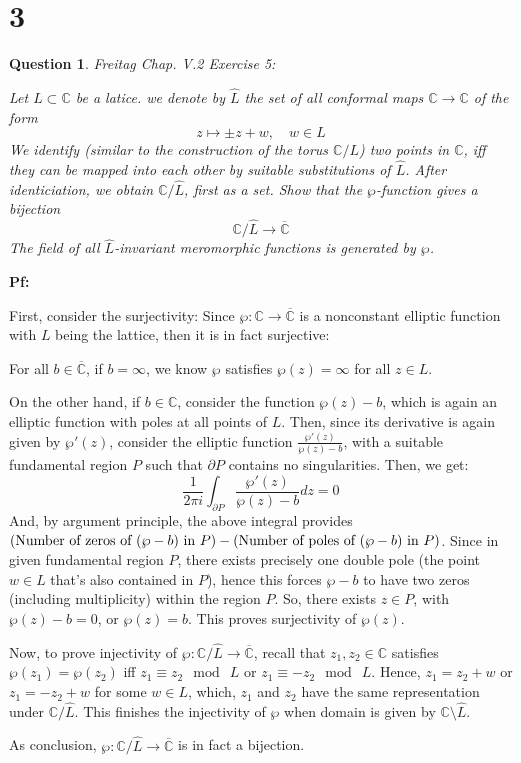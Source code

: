 \documentclass{article}
\newtheorem{question}{Question}
\begin{document}
\section*{3}
\begin{myBox}[]{}
    \begin{question}
        Freitag Chap. V.2 Exercise 5:

        Let $L\subset \mathbb{C}$ be a latice. we denote by $\widehat{L}$ the set of all conformal maps $\mathbb{C}\rightarrow\mathbb{C}$ of the form 
        $$z\mapsto \pm z+w,\quad w\in L$$
        We identify (similar to the construction of the torus $\mathbb{C}/L$) two points in $\mathbb{C}$,
        iff they can be mapped into each other by suitable substitutions of $\widehat{L}$. After identiciation, we obtain $\mathbb{C}/\widehat{L}$, first as a set.
        Show that the $\wp$-function gives a bijection
        $$\mathbb{C}/\widehat{L}\rightarrow\overline{\mathbb{C}}$$
        The field of all $\widehat{L}$-invariant meromorphic functions is generated by $\wp$.
    \end{question}
\end{myBox}

\textbf{Pf:}

First, consider the surjectivity: Since $\wp:\mathbb{C}\rightarrow\overline{\mathbb{C}}$ is a nonconstant elliptic function with $L$ being the lattice, 
then it is in fact surjective:

For all $b\in\overline{\mathbb{C}}$, if $b=\infty$, we know $\wp$ satisfies $\wp(z)=\infty$ for all $z\in L$.

On the other hand, if $b\in\mathbb{C}$, consider the function $\wp(z)-b$, which is again an elliptic function with poles at all points of $L$.
Then, since its derivative is again given by $\wp'(z)$, consider the elliptic function $\frac{\wp'(z)}{\wp(z)-b}$, with a suitable fundamental region $P$ such that $\partial P$
contains no singularities. Then, we get:
$$\frac{1}{2\pi i}\int_{\partial P}\frac{\wp'(z)}{\wp(z)-b}dz = 0$$
And, by argument principle, the above integral provides $(\textmd{Number of zeros of }(\wp-b)\textmd{ in }P)-(\textmd{Number of poles of }(\wp-b)\textmd{ in }P)$. 
Since in given fundamental region $P$, there exists precisely one double pole (the point $w\in L$ that's also contained in $P$),
hence this forces $\wp-b$ to have two zeros (including multiplicity) within the region $P$.
So, there exists $z\in P$, with  $\wp(z)-b=0$, or $\wp(z)=b$. This proves surjectivity of $\wp(z)$.

\hfil

Now, to prove injectivity of $\wp:\mathbb{C}/\widehat{L}\rightarrow\overline{\mathbb{C}}$, recall that $z_1,z_2\in\mathbb{C}$ satisfies $\wp(z_1)=\wp(z_2)$ iff $z_1\equiv z_2\mod\ L$ or $z_1\equiv -z_2\mod\ L$.
Hence, $z_1 = z_2+w$ or $z_1=-z_2+w$ for some $w\in L$, which, $z_1$ and $z_2$ have the same representation under $\mathbb{C}/\widehat{L}$.
This finishes the injectivity of $\wp$ when domain is given by $\mathbb{C}\setminus \widehat{L}$.

\hfil

As conclusion, $\wp:\mathbb{C}/\widehat{L}\rightarrow\overline{\mathbb{C}}$ is in fact a bijection.
\end{document}
